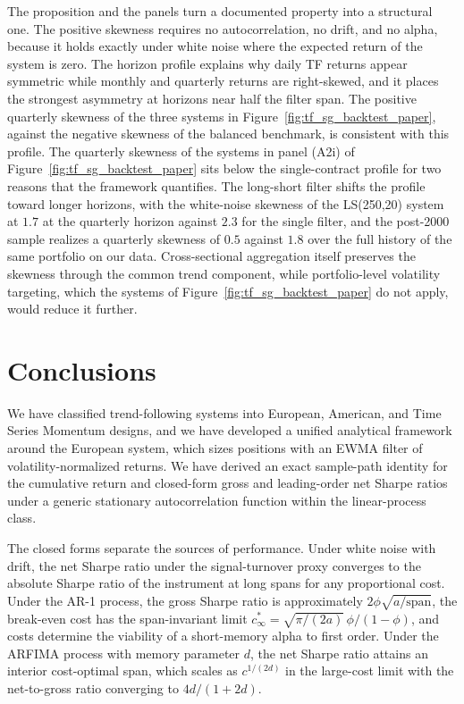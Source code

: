 \documentclass[hidelinks]{siamonline250211}
\newcommand{\spn}{\mathrm{span}}
\begin{document}
The proposition and the panels turn a documented property into a structural one. The positive skewness requires no autocorrelation, no drift, and no alpha, because it holds exactly under white noise where the expected return of the system is zero. The horizon profile explains why daily TF returns appear symmetric while monthly and quarterly returns are right-skewed, and it places the strongest asymmetry at horizons near half the filter span. The positive quarterly skewness of the three systems in Figure~\ref{fig:tf_sg_backtest_paper}, against the negative skewness of the balanced benchmark, is consistent with this profile. The quarterly skewness of the systems in panel (A2i) of Figure~\ref{fig:tf_sg_backtest_paper} sits below the single-contract profile for two reasons that the framework quantifies. The long-short filter shifts the profile toward longer horizons, with the white-noise skewness of the LS(250,20) system at $1.7$ at the quarterly horizon against $2.3$ for the single filter, and the post-2000 sample realizes a quarterly skewness of $0.5$ against $1.8$ over the full history of the same portfolio on our data. Cross-sectional aggregation itself preserves the skewness through the common trend component, while portfolio-level volatility targeting, which the systems of Figure~\ref{fig:tf_sg_backtest_paper} do not apply, would reduce it further.

\section{Conclusions}

We have classified trend-following systems into European, American, and Time Series Momentum designs, and we have developed a unified analytical framework around the European system, which sizes positions with an EWMA filter of volatility-normalized returns. We have derived an exact sample-path identity for the cumulative return and closed-form gross and leading-order net Sharpe ratios under a generic stationary autocorrelation function within the linear-process class.

The closed forms separate the sources of performance. Under white noise with drift, the net Sharpe ratio under the signal-turnover proxy converges to the absolute Sharpe ratio of the instrument at long spans for any proportional cost. Under the AR-1 process, the gross Sharpe ratio is approximately $2\phi\sqrt{a/\spn}$, the break-even cost has the span-invariant limit $c^{*}_{\infty}=\sqrt{\pi/(2a)}\,\phi/(1-\phi)$, and costs determine the viability of a short-memory alpha to first order. Under the ARFIMA process with memory parameter $d$, the net Sharpe ratio attains an interior cost-optimal span, which scales as $c^{1/(2d)}$ in the large-cost limit with the net-to-gross ratio converging to $4d/(1+2d)$.
\end{document}
